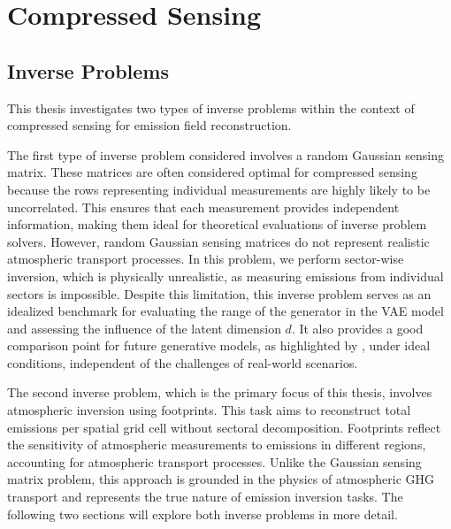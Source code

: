 
\chapter{Compressed Sensing}

\section{Inverse Problems} 
This thesis investigates two types of inverse problems within the context of compressed sensing for emission field reconstruction.

The first type of inverse problem considered involves a random Gaussian sensing matrix.
These matrices are often considered optimal for compressed sensing because the rows representing individual measurements are highly likely to be uncorrelated.
This ensures that each measurement provides independent information, making them ideal for theoretical evaluations of inverse problem solvers.
However, random Gaussian sensing matrices do not represent realistic atmospheric transport processes.
In this problem, we perform sector-wise inversion, which is physically unrealistic, as measuring emissions from individual sectors is impossible.
Despite this limitation, this inverse problem serves as an idealized benchmark for evaluating the range of the generator in the \gls{VAE} model and assessing the influence of the latent dimension $d$.
It also provides a good comparison point for future generative models, as highlighted by \textcite{CSUsingAI}, under ideal conditions, independent of the challenges of real-world scenarios.

The second inverse problem, which is the primary focus of this thesis, involves atmospheric inversion using footprints.
This task aims to reconstruct total emissions per spatial grid cell without sectoral decomposition.
Footprints reflect the sensitivity of atmospheric measurements to emissions in different regions, accounting for atmospheric transport processes.
Unlike the Gaussian sensing matrix problem, this approach is grounded in the physics of atmospheric \gls{GHG} transport and represents the true nature of emission inversion tasks.
The following two sections will explore both inverse problems in more detail.

